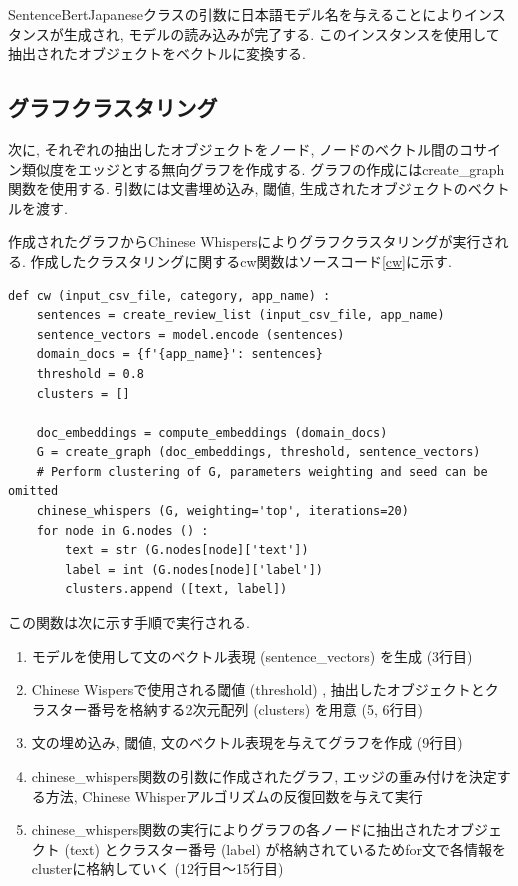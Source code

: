 

SentenceBertJapaneseクラスの引数に日本語モデル名を与えることによりインスタンスが生成され, モデルの読み込みが完了する. このインスタンスを使用して抽出されたオブジェクトをベクトルに変換する. 


\subsection{グラフクラスタリング}
次に, それぞれの抽出したオブジェクトをノード, ノードのベクトル間のコサイン類似度をエッジとする無向グラフを作成する. グラフの作成にはcreate\_graph関数を使用する. 引数には文書埋め込み, 閾値, 生成されたオブジェクトのベクトルを渡す. 

作成されたグラフからChinese Whispersによりグラフクラスタリングが実行される. 作成したクラスタリングに関するcw関数はソースコード\ref{cw}に示す. 

\begin{lstlisting}[caption=cw関数,label=cw]
  def cw (input_csv_file, category, app_name) :
    sentences = create_review_list (input_csv_file, app_name) 
    sentence_vectors = model.encode (sentences) 
    domain_docs = {f'{app_name}': sentences}
    threshold = 0.8
    clusters = []
    
    doc_embeddings = compute_embeddings (domain_docs) 
    G = create_graph (doc_embeddings, threshold, sentence_vectors) 
    # Perform clustering of G, parameters weighting and seed can be omitted
    chinese_whispers (G, weighting='top', iterations=20) 
    for node in G.nodes () :
        text = str (G.nodes[node]['text']) 
        label = int (G.nodes[node]['label']) 
        clusters.append ([text, label]) 
\end{lstlisting}

この関数は次に示す手順で実行される. 

\begin{enumerate}
  \item モデルを使用して文のベクトル表現 (sentence\_vectors) を生成 (3行目) 
  \item Chinese Wispersで使用される閾値 (threshold) , 抽出したオブジェクトとクラスター番号を格納する2次元配列 (clusters) を用意 (5, 6行目)
  \item 文の埋め込み, 閾値, 文のベクトル表現を与えてグラフを作成 (9行目)
  \item chinese\_whispers関数の引数に作成されたグラフ, エッジの重み付けを決定する方法, Chinese Whisperアルゴリズムの反復回数を与えて実行
  \item chinese\_whispers関数の実行によりグラフの各ノードに抽出されたオブジェクト (text) とクラスター番号 (label) が格納されているためfor文で各情報をclusterに格納していく (12行目〜15行目)
\end{enumerate}

